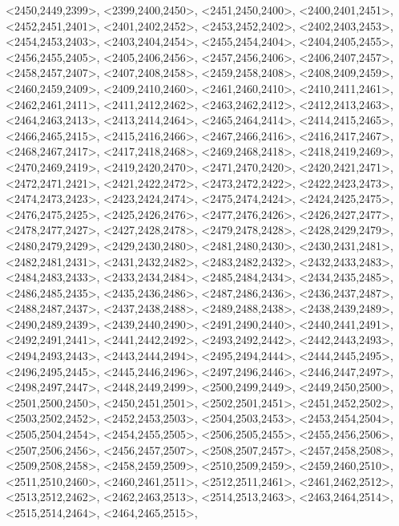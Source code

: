 \documentclass[a4paper,10pt]{article}
\begin{document}
\begin{eulernotebook}
\begin{euleroutput}
  <2450,2449,2399>,
  <2399,2400,2450>,
  <2451,2450,2400>,
  <2400,2401,2451>,
  <2452,2451,2401>,
  <2401,2402,2452>,
  <2453,2452,2402>,
  <2402,2403,2453>,
  <2454,2453,2403>,
  <2403,2404,2454>,
  <2455,2454,2404>,
  <2404,2405,2455>,
  <2456,2455,2405>,
  <2405,2406,2456>,
  <2457,2456,2406>,
  <2406,2407,2457>,
  <2458,2457,2407>,
  <2407,2408,2458>,
  <2459,2458,2408>,
  <2408,2409,2459>,
  <2460,2459,2409>,
  <2409,2410,2460>,
  <2461,2460,2410>,
  <2410,2411,2461>,
  <2462,2461,2411>,
  <2411,2412,2462>,
  <2463,2462,2412>,
  <2412,2413,2463>,
  <2464,2463,2413>,
  <2413,2414,2464>,
  <2465,2464,2414>,
  <2414,2415,2465>,
  <2466,2465,2415>,
  <2415,2416,2466>,
  <2467,2466,2416>,
  <2416,2417,2467>,
  <2468,2467,2417>,
  <2417,2418,2468>,
  <2469,2468,2418>,
  <2418,2419,2469>,
  <2470,2469,2419>,
  <2419,2420,2470>,
  <2471,2470,2420>,
  <2420,2421,2471>,
  <2472,2471,2421>,
  <2421,2422,2472>,
  <2473,2472,2422>,
  <2422,2423,2473>,
  <2474,2473,2423>,
  <2423,2424,2474>,
  <2475,2474,2424>,
  <2424,2425,2475>,
  <2476,2475,2425>,
  <2425,2426,2476>,
  <2477,2476,2426>,
  <2426,2427,2477>,
  <2478,2477,2427>,
  <2427,2428,2478>,
  <2479,2478,2428>,
  <2428,2429,2479>,
  <2480,2479,2429>,
  <2429,2430,2480>,
  <2481,2480,2430>,
  <2430,2431,2481>,
  <2482,2481,2431>,
  <2431,2432,2482>,
  <2483,2482,2432>,
  <2432,2433,2483>,
  <2484,2483,2433>,
  <2433,2434,2484>,
  <2485,2484,2434>,
  <2434,2435,2485>,
  <2486,2485,2435>,
  <2435,2436,2486>,
  <2487,2486,2436>,
  <2436,2437,2487>,
  <2488,2487,2437>,
  <2437,2438,2488>,
  <2489,2488,2438>,
  <2438,2439,2489>,
  <2490,2489,2439>,
  <2439,2440,2490>,
  <2491,2490,2440>,
  <2440,2441,2491>,
  <2492,2491,2441>,
  <2441,2442,2492>,
  <2493,2492,2442>,
  <2442,2443,2493>,
  <2494,2493,2443>,
  <2443,2444,2494>,
  <2495,2494,2444>,
  <2444,2445,2495>,
  <2496,2495,2445>,
  <2445,2446,2496>,
  <2497,2496,2446>,
  <2446,2447,2497>,
  <2498,2497,2447>,
  <2448,2449,2499>,
  <2500,2499,2449>,
  <2449,2450,2500>,
  <2501,2500,2450>,
  <2450,2451,2501>,
  <2502,2501,2451>,
  <2451,2452,2502>,
  <2503,2502,2452>,
  <2452,2453,2503>,
  <2504,2503,2453>,
  <2453,2454,2504>,
  <2505,2504,2454>,
  <2454,2455,2505>,
  <2506,2505,2455>,
  <2455,2456,2506>,
  <2507,2506,2456>,
  <2456,2457,2507>,
  <2508,2507,2457>,
  <2457,2458,2508>,
  <2509,2508,2458>,
  <2458,2459,2509>,
  <2510,2509,2459>,
  <2459,2460,2510>,
  <2511,2510,2460>,
  <2460,2461,2511>,
  <2512,2511,2461>,
  <2461,2462,2512>,
  <2513,2512,2462>,
  <2462,2463,2513>,
  <2514,2513,2463>,
  <2463,2464,2514>,
  <2515,2514,2464>,
  <2464,2465,2515>,

\end{euleroutput}
\end{eulernotebook}
\end{document}

